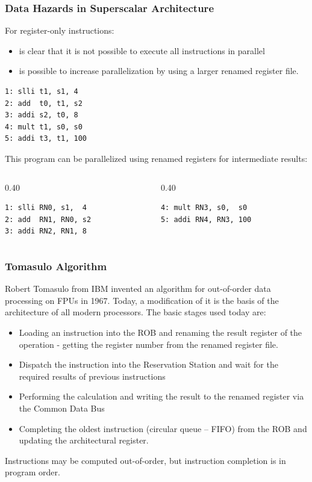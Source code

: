 \documentclass[aspectratio=169]{beamer}
\begin{document}
\begin{frame}[fragile]
\frametitle{Data Hazards in Superscalar Architecture}

For register-only instructions:
\begin{itemize}
\item is clear that it is not possible to execute all instructions in parallel
\item is possible to increase parallelization by using a larger renamed register file.
\end{itemize}

\begin{verbatim}
1: slli t1, s1, 4
2: add  t0, t1, s2
3: addi s2, t0, 8
4: mult t1, s0, s0
5: addi t3, t1, 100
\end{verbatim}

This program can be parallelized using renamed registers for intermediate results:

\begin{columns}[T]
\begin{column}{0.40\textwidth}
\begin{verbatim}
1: slli RN0, s1,  4
2: add  RN1, RN0, s2
3: addi RN2, RN1, 8
\end{verbatim}
\end{column}
\begin{column}{0.40\textwidth}
\begin{verbatim}
4: mult RN3, s0,  s0
5: addi RN4, RN3, 100
\end{verbatim}
\end{column}
\end{columns}
\end{frame}


\begin{frame}
\frametitle{Tomasulo Algorithm}

Robert Tomasulo from IBM invented an algorithm for out-of-order data processing on FPUs in 1967.
Today, a modification of it is the basis of the architecture of all modern processors.
The basic stages used today are:
\begin{itemize}
\item Loading an instruction into the ROB and renaming the result register of the operation - getting the register number from the renamed register file.
\item Dispatch the instruction into the Reservation Station and wait for the required results of previous instructions
\item Performing the calculation and writing the result to the renamed register via the Common Data Bus
\item Completing the oldest instruction (circular queue -- FIFO) from the ROB and updating the architectural register.
\end{itemize}
Instructions may be computed out-of-order, but instruction completion is in program order.
\end{frame}
\end{document}
